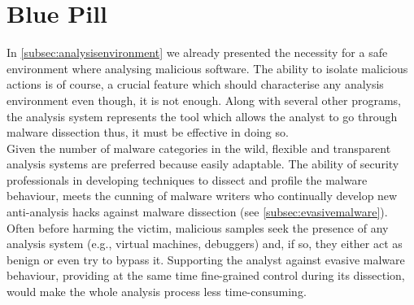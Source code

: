 \documentclass[LaM,binding=0.6cm]{sapthesis}
\begin{document}
\section{Blue Pill}
\label{sec:bluepill}
In \autoref{subsec:analysisenvironment} we already presented the necessity for a safe environment where analysing malicious software. The ability to isolate malicious actions is of course, a crucial feature which should characterise any analysis environment even though, it is not enough. Along with several other programs, the analysis system represents the tool which allows the analyst to go through malware dissection thus, it must be effective in doing so.\\
Given the number of malware categories in the wild, flexible and transparent analysis systems are preferred because easily adaptable. The ability of security professionals in developing techniques to dissect and profile the malware behaviour, meets the cunning of malware writers who continually develop new anti-analysis hacks against malware dissection (see \autoref{subsec:evasivemalware}). Often before harming the victim, malicious samples seek the presence of any analysis system (e.g., virtual machines, debuggers) and, if so, they either act as benign or even try to bypass it. Supporting the analyst against evasive malware behaviour, providing at the same time fine-grained control during its dissection, would make the whole analysis process less time-consuming.
\end{document}
